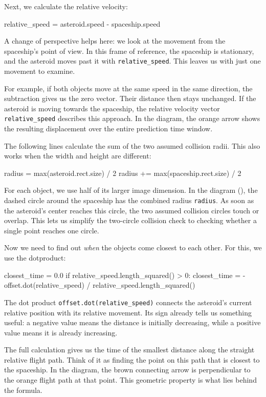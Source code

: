 Next, we calculate the relative velocity:
\begin{codebox}
	relative_speed = asteroid.speed - spaceship.speed
\end{codebox}

A change of perspective helps here: we look at the movement from the spaceship's point of view. In this frame of reference, the spaceship is stationary, and the asteroid moves past it with \texttt{relative\_speed}. This leaves us with just one movement to examine.

For example, if both objects move at the same speed in the same direction, the subtraction gives us the zero vector. Their distance then stays unchanged. If the asteroid is moving towards the spaceship, the relative velocity vector \texttt{relative\_speed} describes this approach. In the diagram, the orange arrow shows the resulting displacement over the entire prediction time window.

The following lines calculate the sum of the two assumed collision radii. This also works when the width and height are different:
\begin{codebox}
radius = max(asteroid.rect.size) / 2
radius += max(spaceship.rect.size) / 2
\end{codebox}

For each object, we use half of its larger image dimension. In the diagram (), the dashed circle around the spaceship has the combined radius \texttt{radius}. As soon as the asteroid's center reaches this circle, the two assumed collision circles touch or overlap. This lets us simplify the two-circle collision check to checking whether a single point reaches one circle.

Now we need to find out \emph{when} the objects come closest to each other. For this, we use the \gls{dotproduct}:
\begin{codebox}
closest_time = 0.0
if relative_speed.length_squared() > 0:
    closest_time = -offset.dot(relative_speed) / relative_speed.length_squared()
\end{codebox}

The dot product \texttt{offset.dot(relative\_speed)} connects the asteroid's current relative position with its relative movement. Its sign already tells us something useful: a negative value means the distance is initially decreasing, while a positive value means it is already increasing.

The full calculation gives us the time of the smallest distance along the straight relative flight path. Think of it as finding the point on this path that is closest to the spaceship. In the diagram, the brown connecting arrow is perpendicular to the orange flight path at that point. This geometric property is what lies behind the formula.

